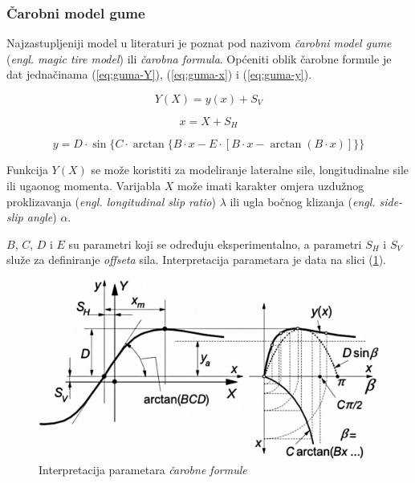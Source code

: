\subsubsection{Čarobni model gume}

\qquad Najzastupljeniji model u literaturi je poznat pod nazivom \textit{čarobni model gume} (\textit{engl. magic tire model}) \citep{pacejka2005tire} ili \textit{čarobna formula}. Općeniti oblik čarobne formule je dat jednačinama (\ref{eq:guma-Y}), (\ref{eq:guma-x}) i (\ref{eq:guma-y}).

\begin{equation}\label{eq:guma-Y}
Y(X) = y(x) + S_V
\end{equation}

\begin{equation}\label{eq:guma-x}
x = X + S_H
\end{equation}

\begin{equation}\label{eq:guma-y}
y = D \cdot \sin \{ C \cdot \arctan \{B \cdot x-E \cdot [B \cdot x- \arctan (B \cdot x)] \} \}
\end{equation}

Funkcija $Y(X)$ se može koristiti za modeliranje lateralne sile, longitudinalne sile ili ugaonog momenta. Varijabla $X$ može imati karakter omjera uzdužnog proklizavanja (\textit{engl. longitudinal slip ratio}) $\lambda$ ili ugla bočnog klizanja (\textit{engl. side-slip angle}) $\alpha$.

$B$, $C$, $D$ i $E$ su parametri koji se određuju eksperimentalno, a parametri $S_H$ i $S_V$ služe za definiranje \textit{offseta} sila. Interpretacija parametara je data na slici (\ref{model:magic-formula}).

\begin{figure}
\centering
\includegraphics[width=\textwidth]{slike/model/magic-formula.png}
\caption{Interpretacija parametara \textit{čarobne formule} \citep{lidfors2020direct}}
\label{model:magic-formula}
\end{figure}

